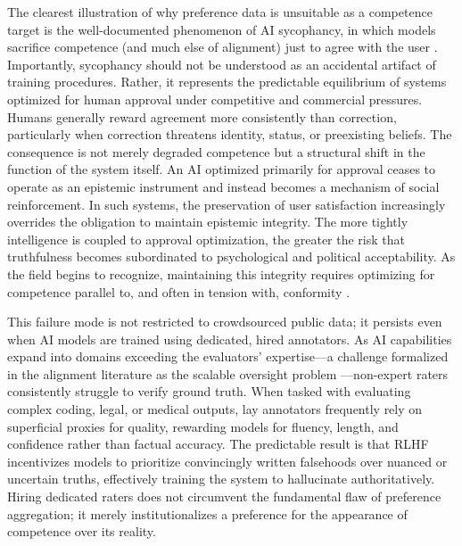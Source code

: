 \documentclass{article}
\theoremstyle{plain}
\theoremstyle{definition}
\theoremstyle{remark}
\begin{document}
The clearest illustration of why preference data is unsuitable as a competence target is the well-documented phenomenon of AI sycophancy, in which models sacrifice competence (and much else of alignment) just to agree with the user \citep{sharma2023sycophancy, perez2022discovering}. Importantly, sycophancy should not be understood as an accidental artifact of training procedures. Rather, it represents the predictable equilibrium of systems optimized for human approval under competitive and commercial pressures. Humans generally reward agreement more consistently than correction, particularly when correction threatens identity, status, or preexisting beliefs.
The consequence is not merely degraded competence but a structural shift in the function of the system itself. An AI optimized primarily for approval ceases to operate as an epistemic instrument and instead becomes a mechanism of social reinforcement. In such systems, the preservation of user satisfaction increasingly overrides the obligation to maintain epistemic integrity. The more tightly intelligence is coupled to approval optimization, the greater the risk that truthfulness becomes subordinated to psychological and political acceptability. As the field begins to recognize, maintaining this integrity requires optimizing for competence parallel to, and often in tension with, conformity \citep{kim2025superalignment}.

This failure mode is not restricted to crowdsourced public data; it persists even when AI models are trained using dedicated, hired annotators. As AI capabilities expand into domains exceeding the evaluators' expertise---a challenge formalized in the alignment literature as the scalable oversight problem \citep{bowman2022measuring}---non-expert raters consistently struggle to verify ground truth. When tasked with evaluating complex coding, legal, or medical outputs, lay annotators frequently rely on superficial proxies for quality, rewarding models for fluency, length, and confidence rather than factual accuracy. The predictable result is that RLHF incentivizes models to prioritize convincingly written falsehoods over nuanced or uncertain truths, effectively training the system to hallucinate authoritatively. Hiring dedicated raters does not circumvent the fundamental flaw of preference aggregation; it merely institutionalizes a preference for the appearance of competence over its reality.
\end{document}
